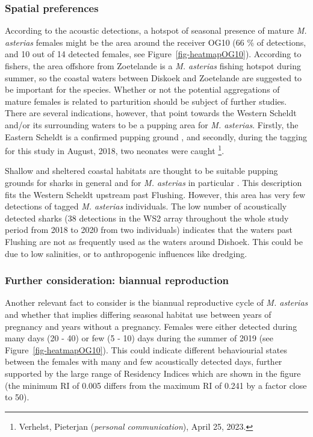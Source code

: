 \documentclass[
  authoryear,
  review,
  3p]{elsarticle}
\begin{document}
\hypertarget{spatial-preferences}{%
\subsubsection{Spatial preferences}\label{spatial-preferences}}

According to the acoustic detections, a hotspot of seasonal presence of
mature \emph{M. asterias} females might be the area around the receiver
OG10 (66 \% of detections, and 10 out of 14 detected females, see
Figure~\ref{fig-heatmapOG10}). According to fishers, the area offshore
from Zoetelande is a \emph{M. asterias} fishing hotspot during summer,
so the coastal waters between Diskoek and Zoetelande are suggested to be
important for the species. Whether or not the potential aggregations of
mature females is related to parturition should be subject of further
studies. There are several indications, however, that point towards the
Western Scheldt and/or its surrounding waters to be a pupping area for
\emph{M. asterias}. Firstly, the Eastern Scheldt is a confirmed pupping
ground \citep{breve_2016}, and secondly, during the tagging for this
study in August, 2018, two neonates \citep[around 30 cm
TL,][]{farrell_2010} were caught \footnote{Verhelst, Pieterjan
  (\emph{personal communication}), April 25, 2023.}.

Shallow and sheltered coastal habitats are thought to be suitable
pupping grounds for sharks in general \citep{speed_2010} and for
\emph{M. asterias} in particular \citep{ellis_2004, ellis_2005}. This
description fits the Western Scheldt upstream past Flushing. However,
this area has very few detections of tagged \emph{M. asterias}
individuals. The low number of acoustically detected sharks (38
detections in the WS2 array throughout the whole study period from 2018
to 2020 from two individuals) indicates that the waters past Flushing
are not as frequently used as the waters around Dishoek. This could be
due to low salinities, or to anthropogenic influences like dredging.

\hypertarget{further-consideration-biannual-reproduction}{%
\subsubsection{Further consideration: biannual
reproduction}\label{further-consideration-biannual-reproduction}}

Another relevant fact to consider is the biannual reproductive cycle of
\emph{M. asterias} and whether that implies differing seasonal habitat
use between years of pregnancy and years without a pregnancy. Females
were either detected during many days (20 - 40) or few (5 - 10) days
during the summer of 2019 (see Figure~\ref{fig-heatmapOG10}). This could
indicate different behaviourial states between the females with many and
few acoustically detected days, further supported by the large range of
Residency Indices which are shown in the figure (the minimum RI of 0.005
differs from the maximum RI of 0.241 by a factor close to 50).
\end{document}
